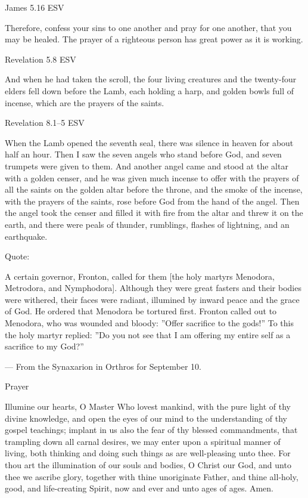 \documentclass[
]{article}
\newcommand{\RL}[1]{\beginR #1\endR}
\begin{document}
James 5.16 ESV

Therefore, confess your sins to one another and pray for one another,
that you may be healed. The prayer of a righteous person has great power
as it is working.

Revelation 5.8 ESV

And when he had taken the scroll, the four living creatures and the
twenty-four elders fell down before the Lamb, each holding a harp, and
golden bowls full of incense, which are the prayers of the saints.

Revelation 8.1--5 ESV

When the Lamb opened the seventh seal, there was silence in heaven for
about half an hour. Then I saw the seven angels who stand before God,
and seven trumpets were given to them. And another angel came and stood
at the altar with a golden censer, and he was given much incense to
offer with the prayers of all the saints on the golden altar before the
throne, and the smoke of the incense, with the prayers of the saints,
rose before God from the hand of the angel. Then the angel took the
censer and filled it with fire from the altar and threw it on the earth,
and there were peals of thunder, rumblings, flashes of lightning, and an
earthquake.

Quote:

A certain governor, Fronton, called for them {[}the holy martyrs
Menodora, Metrodora, and Nymphodora{]}. Although they were great fasters
and their bodies were withered, their faces were radiant, illumined by
inward peace and the grace of God. He ordered that Menodora be tortured
first. Fronton called out to Menodora, who was wounded and bloody:
\RL{''}Offer sacrifice to the gods!'' To this the holy martyr replied:
\RL{''}Do you not see that I am offering my entire self as a sacrifice
to my God?''

--- From the Synaxarion in Orthros for September 10.

Prayer

Illumine our hearts, O Master Who lovest mankind, with the pure light of
thy divine knowledge, and open the eyes of our mind to the understanding
of thy gospel teachings; implant in us also the fear of thy blessed
commandments, that trampling down all carnal desires, we may enter upon
a spiritual manner of living, both thinking and doing such things as are
well-pleasing unto thee. For thou art the illumination of our souls and
bodies, O Christ our God, and unto thee we ascribe glory, together with
thine unoriginate Father, and thine all-holy, good, and life-creating
Spirit, now and ever and unto ages of ages. Amen.
\end{document}
